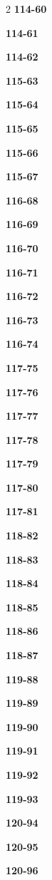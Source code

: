 \documentclass[10pt,a4paper]{article}
\begin{document}
\begin{multicols}{2}
\noindent\textbf{114-60}\ \par
\noindent\textbf{114-61}\ \par
\noindent\textbf{114-62}\ \par
\noindent\textbf{115-63}\ \par
\noindent\textbf{115-64}\ \par
\noindent\textbf{115-65}\ \par
\noindent\textbf{115-66}\ \par
\noindent\textbf{115-67}\ \par
\noindent\textbf{116-68}\ \par
\noindent\textbf{116-69}\ \par
\noindent\textbf{116-70}\ \par
\noindent\textbf{116-71}\ \par
\noindent\textbf{116-72}\ \par
\noindent\textbf{116-73}\ \par
\noindent\textbf{116-74}\ \par
\noindent\textbf{117-75}\ \par
\noindent\textbf{117-76}\ \par
\noindent\textbf{117-77}\ \par
\noindent\textbf{117-78}\ \par
\noindent\textbf{117-79}\ \par
\noindent\textbf{117-80}\ \par
\noindent\textbf{117-81}\ \par
\noindent\textbf{118-82}\ \par
\noindent\textbf{118-83}\ \par
\noindent\textbf{118-84}\ \par
\noindent\textbf{118-85}\ \par
\noindent\textbf{118-86}\ \par
\noindent\textbf{118-87}\ \par
\noindent\textbf{119-88}\ \par
\noindent\textbf{119-89}\ \par
\noindent\textbf{119-90}\ \par
\noindent\textbf{119-91}\ \par
\noindent\textbf{119-92}\ \par
\noindent\textbf{119-93}\ \par
\noindent\textbf{120-94}\ \par
\noindent\textbf{120-95}\ \par
\noindent\textbf{120-96}\ \par

\end{multicols}
\end{document}
